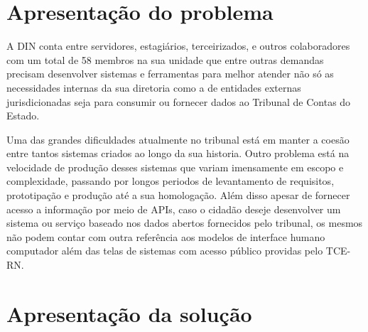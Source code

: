 \section{Apresentação do problema }

  A DIN conta entre servidores, estagiários, terceirizados, e outros colaboradores com um total de 58 membros na sua unidade \cite{relatorio_trimestral} que entre outras demandas precisam desenvolver sistemas e ferramentas para melhor atender não só as necessidades internas da sua diretoria como a de entidades externas jurisdicionadas seja para consumir ou fornecer dados ao Tribunal de Contas do Estado.

  Uma das grandes dificuldades atualmente no tribunal está em manter a coesão entre tantos sistemas criados ao longo da sua historia. Outro problema está na velocidade de produção desses sistemas que variam imensamente em escopo e complexidade, passando por longos periodos de levantamento de requisitos, prototipação e produção até a sua homologação. Além disso apesar de fornecer acesso a informação por meio de APIs, caso o cidadão deseje desenvolver um sistema ou serviço baseado nos dados abertos fornecidos pelo tribunal, os mesmos não podem contar com outra referência aos modelos de interface humano computador além das telas de sistemas com acesso público providas pelo TCE-RN.



\section{Apresentação da solução }

